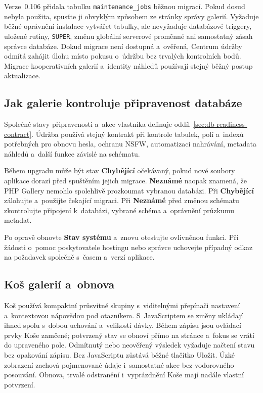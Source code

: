\documentclass[11pt,a4paper]{article}
\newcommand{\ui}[1]{\textbf{#1}}
\newcommand{\codeword}[1]{\nolinkurl{#1}}
\begin{document}
Verze~0.106 přidala tabulku \codeword{maintenance\_jobs} běžnou migrací. Pokud
dosud nebyla použita, spusťte ji obvyklým způsobem ze stránky správy galerií.
Vyžaduje běžné oprávnění instalace vytvářet tabulky, ale nevyžaduje databázové
triggery, uložené rutiny, \codeword{SUPER}, změnu globální serverové proměnné
ani samostatný zásah správce databáze. Dokud migrace není dostupná a~ověřená,
Centrum údržby odmítá zahájit úlohu místo pokusu o~údržbu bez trvalých
kontrolních bodů. Migrace kooperativních galerií a~identity náhledů používají
stejný běžný postup aktualizace.

\subsection{Jak galerie kontroluje připravenost databáze}

Společné stavy připravenosti a~akce vlastníka definuje
oddíl~\ref{sec:db-readiness-contract}. Údržba používá stejný kontrakt při
kontrole tabulek, polí a~indexů potřebných pro obnovu hesla, ochranu NSFW,
automatizaci nahrávání, metadata náhledů a~další funkce závislé na schématu.

Během upgradu může být stav \ui{Chybějící} očekávaný, pokud nové soubory
aplikace dorazí před spuštěním jejich migrace. \ui{Neznámé} naopak znamená, že
PHP Gallery nemohlo spolehlivě prozkoumat vybranou databázi. Při \ui{Chybějící}
zálohujte a~použijte čekající migraci. Při \ui{Neznámé} před změnou schématu
zkontrolujte připojení k~databázi, vybrané schéma a~oprávnění průzkumu metadat.

Po opravě obnovte \ui{Stav systému} a~znovu otestujte ovlivněnou funkci. Při
žádosti o~pomoc poskytovatele hostingu nebo správce uchovejte případný odkaz na
požadavek společně s~časem a~verzí aplikace.

\subsection{Koš galerií a~obnova}

Koš používá kompaktní průsvitné skupiny s~viditelnými přepínači nastavení
a~kontextovou nápovědou pod otazníkem. S~JavaScriptem se změny ukládají ihned
spolu s~dobou uchování a~velikostí dávky. Během zápisu jsou ovládací prvky Koše
zamčené; potvrzený stav se obnoví přímo na stránce a~fokus se vrátí do
upraveného
pole. Odmítnutý nebo neověřený výsledek vyžaduje načtení stavu bez opakování
zápisu. Bez JavaScriptu zůstává běžné tlačítko Uložit. Úzké zobrazení zachová
pojmenované údaje i~samostatné akce bez vodorovného posouvání. Obnova, trvalé
odstranění i~vyprázdnění Koše mají nadále vlastní potvrzení.
\end{document}
